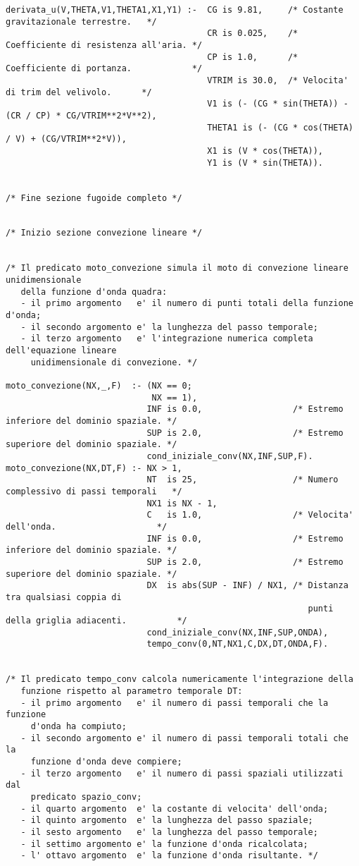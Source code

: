 \begin{verbatim}
derivata_u(V,THETA,V1,THETA1,X1,Y1) :-  CG is 9.81,     /* Costante gravitazionale terrestre.   */
                                        CR is 0.025,    /* Coefficiente di resistenza all'aria. */
                                        CP is 1.0,      /* Coefficiente di portanza.            */
                                        VTRIM is 30.0,  /* Velocita' di trim del velivolo.      */
                                        V1 is (- (CG * sin(THETA)) - (CR / CP) * CG/VTRIM**2*V**2),
                                        THETA1 is (- (CG * cos(THETA) / V) + (CG/VTRIM**2*V)),
                                        X1 is (V * cos(THETA)),
                                        Y1 is (V * sin(THETA)).


/* Fine sezione fugoide completo */


/* Inizio sezione convezione lineare */


/* Il predicato moto_convezione simula il moto di convezione lineare unidimensionale
   della funzione d'onda quadra:
   - il primo argomento   e' il numero di punti totali della funzione d'onda;
   - il secondo argomento e' la lunghezza del passo temporale;
   - il terzo argomento   e' l'integrazione numerica completa dell'equazione lineare 
     unidimensionale di convezione. */

moto_convezione(NX,_,F)  :- (NX == 0;
                             NX == 1),
                            INF is 0.0,                  /* Estremo inferiore del dominio spaziale. */
                            SUP is 2.0,                  /* Estremo superiore del dominio spaziale. */
                            cond_iniziale_conv(NX,INF,SUP,F).
moto_convezione(NX,DT,F) :- NX > 1,
                            NT  is 25,                   /* Numero complessivo di passi temporali   */
                            NX1 is NX - 1,
                            C   is 1.0,                  /* Velocita' dell'onda.                    */
                            INF is 0.0,                  /* Estremo inferiore del dominio spaziale. */
                            SUP is 2.0,                  /* Estremo superiore del dominio spaziale. */
                            DX  is abs(SUP - INF) / NX1, /* Distanza tra qualsiasi coppia di
                                                            punti della griglia adiacenti.          */
                            cond_iniziale_conv(NX,INF,SUP,ONDA),
                            tempo_conv(0,NT,NX1,C,DX,DT,ONDA,F).


/* Il predicato tempo_conv calcola numericamente l'integrazione della
   funzione rispetto al parametro temporale DT:
   - il primo argomento   e' il numero di passi temporali che la funzione
     d'onda ha compiuto;
   - il secondo argomento e' il numero di passi temporali totali che la
     funzione d'onda deve compiere; 
   - il terzo argomento   e' il numero di passi spaziali utilizzati dal
     predicato spazio_conv;
   - il quarto argomento  e' la costante di velocita' dell'onda;     
   - il quinto argomento  e' la lunghezza del passo spaziale;
   - il sesto argomento   e' la lunghezza del passo temporale;
   - il settimo argomento e' la funzione d'onda ricalcolata;
   - l' ottavo argomento  e' la funzione d'onda risultante. */


\end{verbatim}

